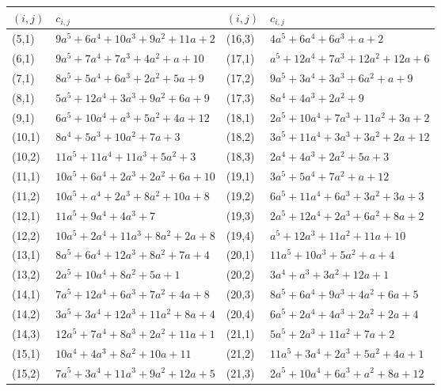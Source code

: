 \documentclass[11pt]{amsart}
\begin{document}
{\footnotesize
\begin{center}
\begin{tabular}{@{}llll@{}}
\toprule
$(i,j)$ & $c_{i,j}$ & $(i,j)$ & $c_{i,j}$\\
\midrule
(5,1) & $9a^5{+}6a^4{+}10a^3{+}9a^2{+}11a{+}2$ & (16,3) & $4a^5{+}6a^4{+}6a^3{+}a{+}2$\\
(6,1) & $9a^5{+}7a^4{+}7a^3{+}4a^2{+}a{+}10$ & (17,1) & $a^5{+}12a^4{+}7a^3{+}12a^2{+}12a{+}6$\\
(7,1) & $8a^5{+}5a^4{+}6a^3{+}2a^2{+}5a{+}9$ & (17,2) & $9a^5{+}3a^4{+}3a^3{+}6a^2{+}a{+}9$\\
(8,1) & $5a^5{+}12a^4{+}3a^3{+}9a^2{+}6a{+}9$ & (17,3) & $8a^4{+}4a^3{+}2a^2{+}9$\\
(9,1) & $6a^5{+}10a^4{+}a^3{+}5a^2{+}4a{+}12$ & (18,1) & $2a^5{+}10a^4{+}7a^3{+}11a^2{+}3a{+}2$\\
(10,1) & $8a^4{+}5a^3{+}10a^2{+}7a{+}3$ & (18,2) & $3a^5{+}11a^4{+}3a^3{+}3a^2{+}2a{+}12$\\
(10,2) & $11a^5{+}11a^4{+}11a^3{+}5a^2{+}3$ & (18,3) & $2a^4{+}4a^3{+}2a^2{+}5a{+}3$\\
(11,1) & $10a^5{+}6a^4{+}2a^3{+}2a^2{+}6a{+}10$ & (19,1) & $3a^5{+}5a^4{+}7a^2{+}a{+}12$\\
(11,2) & $10a^5{+}a^4{+}2a^3{+}8a^2{+}10a{+}8$ & (19,2) & $6a^5{+}11a^4{+}6a^3{+}3a^2{+}3a{+}3$\\
(12,1) & $11a^5{+}9a^4{+}4a^3{+}7$ & (19,3) & $2a^5{+}12a^4{+}2a^3{+}6a^2{+}8a{+}2$\\
(12,2) & $10a^5{+}2a^4{+}11a^3{+}8a^2{+}2a{+}8$ & (19,4) & $a^5{+}12a^3{+}11a^2{+}11a{+}10$\\
(13,1) & $8a^5{+}6a^4{+}12a^3{+}8a^2{+}7a{+}4$ & (20,1) & $11a^5{+}10a^3{+}5a^2{+}a{+}4$\\
(13,2) & $2a^5{+}10a^4{+}8a^2{+}5a{+}1$ & (20,2) & $3a^4{+}a^3{+}3a^2{+}12a{+}1$\\
(14,1) & $7a^5{+}12a^4{+}6a^3{+}7a^2{+}4a{+}8$ & (20,3) & $8a^5{+}6a^4{+}9a^3{+}4a^2{+}6a{+}5$\\
(14,2) & $3a^5{+}3a^4{+}12a^3{+}11a^2{+}8a{+}4$ & (20,4) & $6a^5{+}2a^4{+}4a^3{+}2a^2{+}2a{+}4$\\
(14,3) & $12a^5{+}7a^4{+}8a^3{+}2a^2{+}11a{+}1$ & (21,1) & $5a^5{+}2a^3{+}11a^2{+}7a{+}2$\\
(15,1) & $10a^4{+}4a^3{+}8a^2{+}10a{+}11$ & (21,2) & $11a^5{+}3a^4{+}2a^3{+}5a^2{+}4a{+}1$\\
(15,2) & $7a^5{+}3a^4{+}11a^3{+}9a^2{+}12a{+}5$ & (21,3) & $2a^5{+}10a^4{+}6a^3{+}a^2{+}8a{+}12$\\

\end{tabular}
\end{center}}
\end{document}
